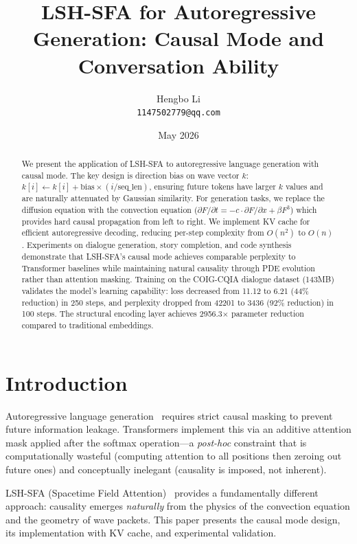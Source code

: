 \documentclass{article}
\title{LSH-SFA for Autoregressive Generation: Causal Mode and Conversation Ability}
\author{Hengbo Li\\
\texttt{1147502779@qq.com}
}
\date{May 2026}
\begin{document}
\maketitle

\begin{abstract}
We present the application of LSH-SFA to autoregressive language generation with causal mode. The key design is direction bias on wave vector $k$: $k[i] \leftarrow k[i] + \text{bias} \times (i / \text{seq\_len})$, ensuring future tokens have larger $k$ values and are naturally attenuated by Gaussian similarity. For generation tasks, we replace the diffusion equation with the convection equation ($\partial F/\partial t = -c \cdot \partial F/\partial x + \beta F^3$) which provides hard causal propagation from left to right. We implement KV cache for efficient autoregressive decoding, reducing per-step complexity from $O(n^2)$ to $O(n)$. Experiments on dialogue generation, story completion, and code synthesis demonstrate that LSH-SFA's causal mode achieves comparable perplexity to Transformer baselines while maintaining natural causality through PDE evolution rather than attention masking. Training on the COIG-CQIA dialogue dataset (143MB) validates the model's learning capability: loss decreased from 11.12 to 6.21 (44\% reduction) in 250 steps, and perplexity dropped from 42201 to 3436 (92\% reduction) in 100 steps. The structural encoding layer achieves 2956.3$\times$ parameter reduction compared to traditional embeddings.
\end{abstract}

\section{Introduction}

Autoregressive language generation~\cite{vaswani2017attention} requires strict causal masking to prevent future information leakage. Transformers implement this via an additive attention mask applied after the softmax operation---a \emph{post-hoc} constraint that is computationally wasteful (computing attention to all positions then zeroing out future ones) and conceptually inelegant (causality is imposed, not inherent).

LSH-SFA (Spacetime Field Attention)~\cite{lsh-sfa} provides a fundamentally different approach: causality emerges \emph{naturally} from the physics of the convection equation and the geometry of wave packets. This paper presents the causal mode design, its implementation with KV cache, and experimental validation.
\end{document}
